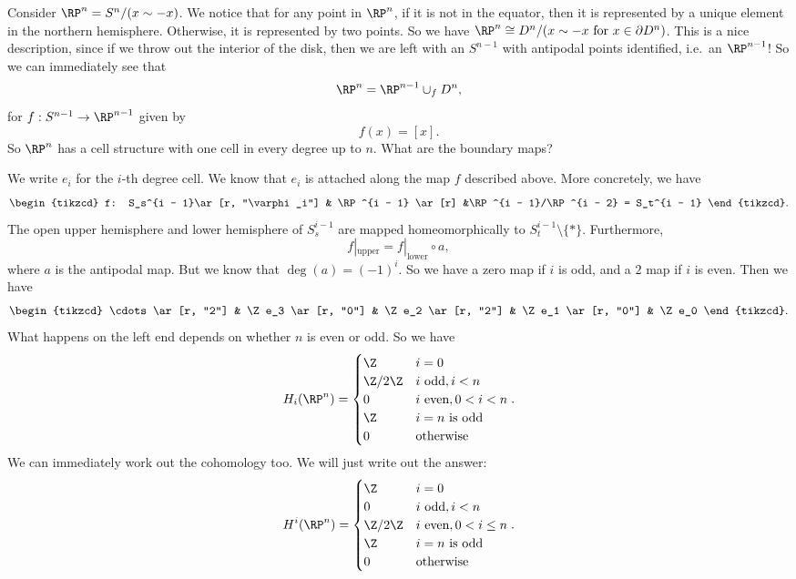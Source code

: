 \documentclass[a4paper]{article}
\theoremstyle{definition}
\begin{document}
\begin{eg}
  Consider $\RP^n = S^n/(x \sim -x)$. We notice that for any point in $\RP^n$, if it is not in the equator, then it is represented by a unique element in the northern hemisphere. Otherwise, it is represented by two points. So we have $\RP^n \cong D^n/(x \sim -x\text{ for }x \in \partial D^n)$. This is a nice description, since if we throw out the interior of the disk, then we are left with an $S^{n - 1}$ with antipodal points identified, i.e.\ an $\RP^{n - 1}$! So we can immediately see that
  \[
    \RP^n = \RP^{n - 1} \cup_f D^n,
  \]
  for $f: S^{n - 1} \to \RP^{n - 1}$ given by
  \[
    f(x) = [x].
  \]
  So $\RP^n$ has a cell structure with one cell in every degree up to $n$. What are the boundary maps?

  We write $e_i$ for the $i$-th degree cell. We know that $e_i$ is attached along the map $f$ described above. More concretely, we have
  \[
    \begin{tikzcd}
      f: S_s^{i - 1}\ar[r, "\varphi_i"] & \RP^{i - 1} \ar[r] &\RP^{i - 1}/\RP^{i - 2} = S_t^{i - 1}
    \end{tikzcd}.
  \]
  The open upper hemisphere and lower hemisphere of $S^{i - 1}_s$ are mapped homeomorphically to $S_t^{i - 1} \setminus \{*\}$. Furthermore,
  \[
    f|_{\mathrm{upper}} = f|_{\mathrm{lower}} \circ a,
  \]
  where $a$ is the antipodal map. But we know that $\deg(a) = (-1)^i$. So we have a zero map if $i$ is odd, and a $2$ map if $i$ is even. Then we have
  \[
    \begin{tikzcd}
      \cdots \ar[r, "2"] & \Z e_3 \ar[r, "0"] & \Z e_2 \ar[r, "2"] & \Z e_1 \ar[r, "0"] & \Z e_0
    \end{tikzcd}.
  \]
  What happens on the left end depends on whether $n$ is even or odd. So we have
  \[
    H_i(\RP^n) =
    \begin{cases}
      \Z & i = 0\\
      \Z/2\Z & i\text{ odd}, i < n\\
      0 & i\text{ even}, 0 < i < n\\
      \Z & i = n\text{ is odd}\\
      0 & \text{otherwise}
    \end{cases}.
  \]
  We can immediately work out the cohomology too. We will just write out the answer:
  \[
    H^i(\RP^n) =
    \begin{cases}
      \Z & i = 0\\
      0 & i\text{ odd}, i < n\\
      \Z/2\Z & i\text{ even}, 0 < i \leq n\\
      \Z & i = n\text{ is odd}\\
      0 & \text{otherwise}
    \end{cases}.
  \]
\end{eg}
\end{document}
